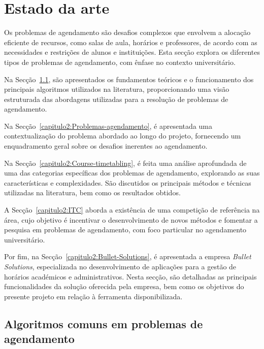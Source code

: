 % 
%  
%
\chapter{Estado da arte}
\label{capitulo:estado-arte}

Os problemas de agendamento são desafios complexos que envolvem a alocação eficiente de recursos, como salas de aula, horários e professores, de acordo com as necessidades e restrições de alunos e instituições. Esta secção explora os diferentes tipos de problemas de agendamento, com ênfase no contexto universitário.

Na Secção~\ref{capitulo2:Teoria-funcionamento-algoritmos}, são apresentados os fundamentos teóricos e o funcionamento dos principais algoritmos utilizados na literatura, proporcionando uma visão estruturada das abordagens utilizadas para a resolução de problemas de agendamento.

Na Secção~\ref{capitulo2:Problemas-agendamento}, é apresentada uma contextualização do problema abordado ao longo do projeto, fornecendo um enquadramento geral sobre os desafios inerentes ao agendamento.

Na Secção~\ref{capitulo2:Course-timetabling}, é feita uma análise aprofundada de uma das categorias específicas dos problemas de agendamento, explorando as suas características e complexidades. São discutidos os principais métodos e técnicas utilizadas na literatura, bem como os resultados obtidos.

A Secção~\ref{capitulo2:ITC} aborda a existência de uma competição de referência na área, cujo objetivo é incentivar o desenvolvimento de novos métodos e fomentar a pesquisa em problemas de agendamento, com foco particular no agendamento universitário.

Por fim, na Secção~\ref{capitulo2:Bullet-Solutions}, é apresentada a empresa \textit{Bullet Solutions}, especializada no desenvolvimento de aplicações para a gestão de horários académicos e administrativos. Nesta secção, são detalhadas as principais funcionalidades da solução oferecida pela empresa, bem como os objetivos do presente projeto em relação à ferramenta disponibilizada.

\section{Algoritmos comuns em problemas de agendamento}
\label{capitulo2:Teoria-funcionamento-algoritmos}

